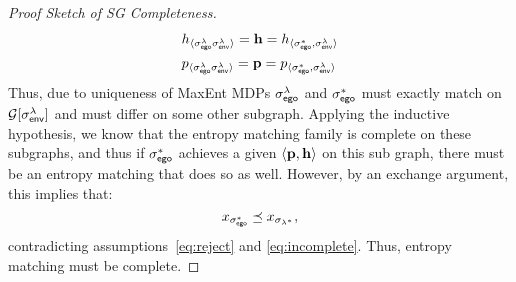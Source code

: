 \begin{proof}[Proof Sketch of SG Completeness]
\begin{equation}
\begin{split}
      &h_{\langle \sigma_{\mathsf{ego}}^\lambda \sigma_{\mathsf{env}}^\lambda \rangle} = \mathbf{h} = h_{\langle \sigma_{\mathsf{ego}}^*, \sigma_{\mathsf{env}}^\lambda \rangle}\\
      &p_{\langle \sigma_{\mathsf{ego}}^\lambda \sigma_{\mathsf{env}}^\lambda\rangle} = \mathbf{p} = p_{\langle \sigma_{\mathsf{ego}}^*, \sigma_{\mathsf{env}}^\lambda\rangle}  
    \end{split}
  \end{equation}
  Thus, due to uniqueness of MaxEnt MDPs $\sigma_{\mathsf{ego}}^\lambda$ and
  $\sigma_{\mathsf{ego}}^*$ must exactly match on $\mathcal{G}[\sigma_{\mathsf{env}}^\lambda]$ and
  must differ on some other subgraph.  Applying the inductive
  hypothesis, we know that the entropy matching family is complete on
  these subgraphs, and thus if $\sigma_{\mathsf{ego}}^*$ achieves a given
  $\langle\mathbf{p}, \mathbf{h}\rangle$ on this sub graph, there
  must be an entropy matching that does so as well.  However, by an
  exchange argument, this implies that:
  \begin{equation}
    x_{\sigma_{\mathsf{ego}}^*} \preceq x_{\sigma_{\lambda^*}},
  \end{equation}
  contradicting
  assumptions~\eqref{eq:reject} and \eqref{eq:incomplete}.  Thus,
  entropy matching must be complete.
\end{proof}

